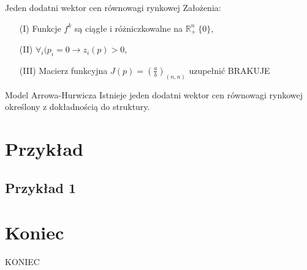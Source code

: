 \documentclass[a4paper, 11pt]{beamer}
\begin{document}
      \begin{frame}{Jeden dodatni wektor cen równowagi rynkowej}
	Założenia:
	\begin{enumerate}
	  \item[(I)] Funkcje $f^k$ są ciągłe i różniczkowalne na
	  $\mathbb{R}^n_{+} \ \{0\}$,

	  \item[(II)] $\forall_i (p_i = 0 \rightarrow z_i (p) > 0$,

	  \item[(III)] Macierz funkcyjna $J(p) = (\frac{a}{b})_{(n, n)}$
	  uzupełnić BRAKUJE
	\end{enumerate}

	\begin{block}{Model Arrowa-Hurwicza}
	  Istnieje jeden dodatni wektor cen równowagi rynkowej określony z
	  dokładnością do struktury.
	\end{block}

      \end{frame}

  \section{Przykład}
    \subsection{Przykład 1}

  \section*{Koniec}

    \begin{frame}
      KONIEC
    \end{frame}
\end{document}
